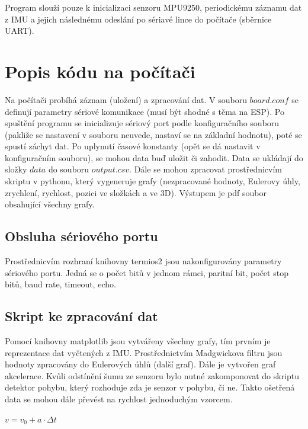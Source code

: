 \documentclass{article}
\begin{document}
\vspace{1em}

Program slouží pouze k inicializaci senzoru MPU9250, periodickému záznamu dat z IMU a jejich následnému odeslání po sériavé lince do počítače (sběrnice UART).

\newpage

\section{Popis kódu na počítači}

Na počítači probíhá záznam (uložení) a zpracování dat. V souboru $board.conf$  se definují parametry sériové komunikace (musí být shodné s těma na ESP). Po spuštění programu se inicializuje sériový port podle konfiguračního souboru (pakliže se nastavení v souboru neuvede, nastaví se na základní hodnotu), poté se spustí záchyt dat. Po uplynutí časové konstanty (opět se dá nastavit v konfiguračním souboru), se mohou data buď uložit či zahodit. Data se ukládají do složky $data$ do souboru $output.csv$. Dále se mohou zpracovat prostřednicvím skriptu v pythonu, který vygeneruje grafy (nezpracované hodnoty, Eulerovy úhly, zrychlení, rychlost, pozici ve složkách a ve 3D). Výstupem je pdf soubor obsahující všechny grafy.

\subsection{Obsluha sériového portu}

Prostřednicvím rozhraní knihovny termios2 jsou nakonfigurovány parametry sériového portu. Jedná se o počet bitů v jednom rámci, paritní bit, počet stop bitů, baud rate, timeout, echo.

\subsection{Skript ke zpracování dat}

Pomocí knihovny matplotlib jsou vytvářeny všechny grafy, tím prvním je reprezentace dat vyčtených z IMU. 
Prostřednictvím Madgwickova filtru jsou hodnoty zpracovány do Eulerových úhlů (další graf). Dále je vytvořen graf akcelerace. Kvůli odstínění šumu ze senzoru bylo nutné zakomponovat do skriptu detektor pohybu, který rozhoduje zda je senzor v pohybu, či ne. Takto ošetřená data se mohou dále převést na rychlost jednoduchým vzorcem.

\begin{center}
    \begin{math}
        v = v_{0} + a \cdot \Delta t
    \end{math}
\end{center}
\end{document}
